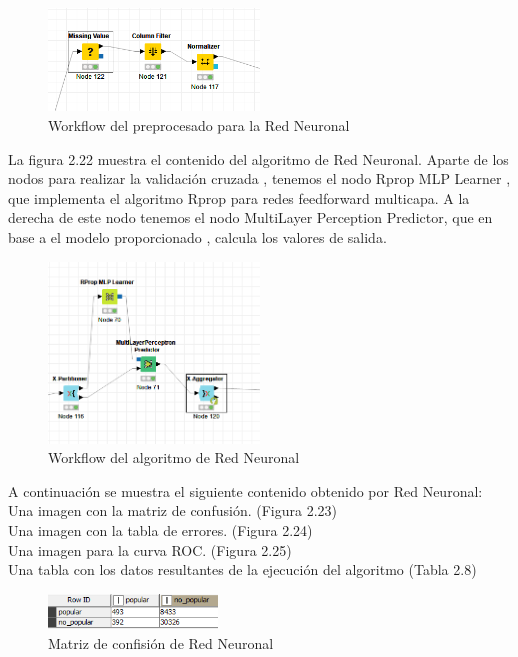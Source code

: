 	\begin{figure}[htb]
		\centering
		\includegraphics[width=0.5\textwidth]{./imagenes/26}
		\caption{Workflow del preprocesado para la Red Neuronal} \label{fig:1}
	\end{figure}
	
	La figura 2.22 muestra el contenido del algoritmo de Red Neuronal. Aparte de los nodos para realizar la validación cruzada , tenemos el nodo Rprop MLP Learner , que implementa el 
	algoritmo Rprop para redes feedforward multicapa. A la derecha de este nodo tenemos el nodo MultiLayer Perception Predictor, que en base a el modelo proporcionado , calcula los valores de salida.


	\begin{figure}[htb]
		\centering
		\includegraphics[width=0.5\textwidth]{./imagenes/27}
		\caption{Workflow del algoritmo de Red Neuronal} \label{fig:1}
	\end{figure}

	A continuación se muestra el siguiente contenido obtenido por Red Neuronal:	\\
	Una imagen con la matriz de confusión. (Figura 2.23) \\
	Una imagen con la tabla de errores. (Figura 2.24) \\
	Una imagen para la curva ROC. (Figura 2.25)	\\
	Una tabla con los datos resultantes de la ejecución del algoritmo (Tabla 2.8)\\

	\begin{figure}[htb]
		\centering
		\includegraphics[width=0.4\textwidth]{./imagenes/29}
		\caption{Matriz de confisión de Red Neuronal} \label{fig:2}
	\end{figure}

